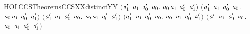 \begin{SaveVerbatim}{HOLCCSTheoremsCCSXXdistinctYY}
   \ensuremath{(}\HOLSymConst{\HOLTokenForall{}}\ensuremath{\HOLBoundVar{a}\sb{\mathrm{1}}\sp{\prime{}}} \ensuremath{\HOLBoundVar{a}\sb{\mathrm{1}}} \ensuremath{\HOLBoundVar{a}\sb{\mathrm{0}}\sp{\prime{}}} \ensuremath{\HOLBoundVar{a}\sb{\mathrm{0}}}. \ensuremath{\HOLBoundVar{a}\sb{\mathrm{0}}}\HOLSymConst{\ensuremath{\ldotp}}\ensuremath{\HOLBoundVar{a}\sb{\mathrm{1}}} \HOLSymConst{\HOLTokenNotEqual{}}  \ensuremath{\HOLBoundVar{a}\sb{\mathrm{0}}\sp{\prime{}}} \ensuremath{\HOLBoundVar{a}\sb{\mathrm{1}}\sp{\prime{}}}\ensuremath{)} \HOLSymConst{\HOLTokenConj{}}
   \ensuremath{(}\HOLSymConst{\HOLTokenForall{}}\ensuremath{\HOLBoundVar{a}\sb{\mathrm{1}}\sp{\prime{}}} \ensuremath{\HOLBoundVar{a}\sb{\mathrm{1}}} \ensuremath{\HOLBoundVar{a}\sb{\mathrm{0}}\sp{\prime{}}} \ensuremath{\HOLBoundVar{a}\sb{\mathrm{0}}}. \ensuremath{\HOLBoundVar{a}\sb{\mathrm{0}}}\HOLSymConst{\ensuremath{\ldotp}}\ensuremath{\HOLBoundVar{a}\sb{\mathrm{1}}} \HOLSymConst{\HOLTokenNotEqual{}}  \ensuremath{\HOLBoundVar{a}\sb{\mathrm{0}}\sp{\prime{}}} \ensuremath{\HOLBoundVar{a}\sb{\mathrm{1}}\sp{\prime{}}}\ensuremath{)} \HOLSymConst{\HOLTokenConj{}}
   \ensuremath{(}\HOLSymConst{\HOLTokenForall{}}\ensuremath{\HOLBoundVar{a}\sb{\mathrm{1}}\sp{\prime{}}} \ensuremath{\HOLBoundVar{a}\sb{\mathrm{1}}} \ensuremath{\HOLBoundVar{a}\sb{\mathrm{0}}\sp{\prime{}}} \ensuremath{\HOLBoundVar{a}\sb{\mathrm{0}}}. \ensuremath{\HOLBoundVar{a}\sb{\mathrm{0}}}\HOLSymConst{\ensuremath{\ldotp}}\ensuremath{\HOLBoundVar{a}\sb{\mathrm{1}}} \HOLSymConst{\HOLTokenNotEqual{}}  \ensuremath{\HOLBoundVar{a}\sb{\mathrm{0}}\sp{\prime{}}} \ensuremath{\HOLBoundVar{a}\sb{\mathrm{1}}\sp{\prime{}}}\ensuremath{)} \HOLSymConst{\HOLTokenConj{}}
   \ensuremath{(}\HOLSymConst{\HOLTokenForall{}}\ensuremath{\HOLBoundVar{a}\sb{\mathrm{1}}\sp{\prime{}}} \ensuremath{\HOLBoundVar{a}\sb{\mathrm{1}}} \ensuremath{\HOLBoundVar{a}\sb{\mathrm{0}}\sp{\prime{}}} \ensuremath{\HOLBoundVar{a}\sb{\mathrm{0}}}. \ensuremath{\HOLBoundVar{a}\sb{\mathrm{0}}} \HOLSymConst{\ensuremath{+}} \ensuremath{\HOLBoundVar{a}\sb{\mathrm{1}}} \HOLSymConst{\HOLTokenNotEqual{}} \ensuremath{\HOLBoundVar{a}\sb{\mathrm{0}}\sp{\prime{}}} \HOLSymConst{\ensuremath{\mid}} \ensuremath{\HOLBoundVar{a}\sb{\mathrm{1}}\sp{\prime{}}}\ensuremath{)} \HOLSymConst{\HOLTokenConj{}}
   \ensuremath{(}\HOLSymConst{\HOLTokenForall{}}\ensuremath{\HOLBoundVar{a}\sb{\mathrm{1}}\sp{\prime{}}} \ensuremath{\HOLBoundVar{a}\sb{\mathrm{1}}} \ensuremath{\HOLBoundVar{a}\sb{\mathrm{0}}\sp{\prime{}}} \ensuremath{\HOLBoundVar{a}\sb{\mathrm{0}}}. \ensuremath{\HOLBoundVar{a}\sb{\mathrm{0}}} \HOLSymConst{\ensuremath{+}} \ensuremath{\HOLBoundVar{a}\sb{\mathrm{1}}} \HOLSymConst{\HOLTokenNotEqual{}}  \ensuremath{\HOLBoundVar{a}\sb{\mathrm{0}}\sp{\prime{}}} \ensuremath{\HOLBoundVar{a}\sb{\mathrm{1}}\sp{\prime{}}}\ensuremath{)} \HOLSymConst{\HOLTokenConj{}}

\end{SaveVerbatim}
